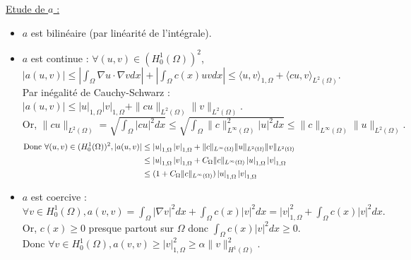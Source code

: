 \documentclass[12pt,a4paper]{article}
\begin{document}
\underline{Etude de $a$ :}
\begin{itemize}
    \item $a$ est bilinéaire (par linéarité de l'intégrale).
    \item $a$ est continue : $\forall (u, v) \in (H^1_0(\Omega))^2$, \\
    $|a(u, v)| \leq \left| \int_{\Omega} \nabla u \cdot \nabla v dx \right| + \left| \int_{\Omega} c(x)uv dx \right| \leq \langle u, v \rangle_{1, \Omega} + \langle cu, v \rangle_{L^2(\Omega)}$. \\

    Par inégalité de Cauchy-Schwarz : \\
    $\left| a(u, v) \right| \leq \left| u \right|_{1, \Omega} \left| v \right|_{1, \Omega} + \| cu \|_{L^2(\Omega)} \| v \|_{L^2(\Omega)}$. \\

    Or, $\| cu \|_{L^2(\Omega)} = \sqrt{\int_{\Omega} \left| cu \right|^2 dx} \leq \sqrt{\int_{\Omega} \| c \|_{L^{\infty}(\Omega)}^2 \left| u \right|^2 dx} \leq \| c \|_{L^{\infty}(\Omega)} \| u \|_{L^2(\Omega)}$.
    \begin{align*}
        \text{Donc } \forall (u, v) \in (H^1_0(\Omega))^2,
        \left| a(u, v) \right| &\leq \left| u \right|_{1, \Omega} \left| v \right|_{1, \Omega} + \| c \|_{L^{\infty}(\Omega)} \| u \|_{L^2(\Omega)} \| v \|_{L^2(\Omega)} \hspace{14.5cm} \\
        &\leq \left| u \right|_{1, \Omega} \left| v \right|_{1, \Omega} + C_{\Omega} \| c \|_{L^{\infty}(\Omega)} \left| u \right|_{1, \Omega} \left| v \right|_{1, \Omega} \\
        &\leq (1 + C_{\Omega} \| c \|_{L^{\infty}(\Omega)}) \left| u \right|_{1, \Omega} \left| v \right|_{1, \Omega}
    \end{align*}
    \item $a$ est coercive : \\
    $\forall v \in H^1_0(\Omega), a(v, v) = \int_{\Omega} \left| \nabla v \right|^2 dx + \int_{\Omega} c(x) \left| v \right|^2 dx = \left| v \right|_{1, \Omega}^2 + \int_{\Omega} c(x) \left| v \right|^2 dx$. \\

    Or, $c(x) \geq 0$ presque partout sur $\Omega$ donc $\int_{\Omega} c(x) \left| v \right|^2 dx \geq 0$. \\
    Donc $\forall v \in H^1_0(\Omega), a(v, v) \geq \left| v \right|_{1, \Omega}^2 \geq \alpha \| v \|_{H^1(\Omega)}^2$.
\end{itemize}
\end{document}
